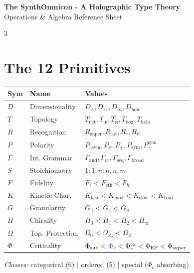 \documentclass[8pt,a4paper,landscape]{article}
\newcommand{\cat}[1]{\textcolor{catblue}{#1}}
\newcommand{\ord}[1]{\textcolor{ordgreen}{#1}}
\newcommand{\spec}[1]{\textcolor{specpurple}{#1}}
\begin{document}
\begin{center}
\LARGE\textbf{The SynthOmnicon - A Holographic Type Theory}\\
\normalsize Operations \& Algebra Reference Sheet
\end{center}
\vspace{-0.3em}

\begin{multicols}{3}

\section*{The 12 Primitives}
\footnotesize
\renewcommand{\arraystretch}{1.1}
\begin{tabular}{@{}llp{3.8cm}@{}}
\toprule
\textbf{Sym} & \textbf{Name} & \textbf{Values} \\
\midrule
\cat{$D$} & Dimensionality & $D_\wedge,D_\triangle,D_\infty,D_{\text{holo}}$ \\
\cat{$T$} & Topology & $T_{\text{net}},T_{\text{in}},T_\bowtie,T_{\text{box}},T_{\text{holo}}$ \\
\cat{$R$} & Recognition & $R_{\text{super}},R_{\text{cat}},R_\dagger,R_{lr}$ \\
\cat{$P$} & Polarity & $P_{\text{asym}},P_\psi,P_\pm,P_{\text{sym}},P_\pm^{\text{sym}}$ \\
\cat{$\Gamma$} & Int. Grammar & $\Gamma_{\text{and}},\Gamma_{\text{or}},\Gamma_{\text{seq}},\Gamma_{\text{broad}}$ \\
\cat{$S$} & Stoichiometry & $1{:}1,n{:}n,n{:}m$ \\
\midrule
\ord{$F$} & Fidelity & $F_\ell<F_{\text{eth}}<F_\hbar$ \\
\ord{$K$} & Kinetic Char. & $K_{\text{fast}}<K_{\text{mod}}<K_{\text{slow}}<K_{\text{trap}}$ \\
\ord{$G$} & Granularity & $G_\beth<G_\gimel<G_\aleph$ \\
\ord{$H$} & Chirality & $H_0<H_1<H_2<H_\infty$ \\
\ord{$\Omega$} & Top. Protection & $\Omega_0<\Omega_{Z_2}<\Omega_Z$ \\
\midrule
\spec{$\Phi$} & Criticality & $\Phi_{\text{sub}}<\spec{\Phi_c}<\Phi_c^{\text{cx}}<\Phi_{\text{EP}}<\Phi_{\text{super}}$ \\
\bottomrule
\end{tabular}
\renewcommand{\arraystretch}{1.0}

\vspace{0.6em}
\textit{Classes:} \cat{categorical (6)} | \ord{ordered (5)} | \spec{special ($\Phi_c$ absorbing)}


\end{multicols}
\end{document}
